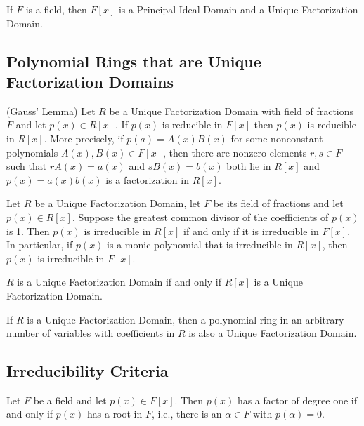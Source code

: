 \documentclass[../main]{subfiles}
\begin{document}
\begin{cor}
 If $F$ is a field, then $F[x]$ is a Principal Ideal Domain and a Unique Factorization Domain.
\end{cor}


\subsection{Polynomial Rings that are Unique Factorization Domains}


\begin{prop}
 (Gauss' Lemma) Let $R$ be a Unique Factorization Domain with field of fractions $F$ and let $p(x) \in R[x]$. If $p(x)$ is reducible in $F[x]$ then $p(x)$ is reducible in $R[x]$. More precisely, if $p(a) = A(x) B(x)$ for some nonconstant polynomials $A(x),B(x) \in F[x]$, then there are nonzero elements $r,s \in F$ such that $r A(x) = a(x)$ and $s B(x) = b(x)$ both lie in $R[x]$ and $p(x) = a(x) b(x)$ is a factorization in $R[x]$.
\end{prop}


\begin{cor}
 Let $R$ be a Unique Factorization Domain, let $F$ be its field of fractions and let $p(x) \in R[x]$. Suppose the greatest common divisor of the coefficients of $p(x)$ is 1. Then $p(x)$ is irreducible in $R[x]$ if and only if it is irreducible in $F[x]$. In particular, if $p(x)$ is a monic polynomial that is irreducible in $R[x]$, then $p(x)$ is irreducible in $F[x]$.
\end{cor}


\begin{thm}
 $R$ is a Unique Factorization Domain if and only if $R[x]$ is a Unique Factorization Domain.
\end{thm}


\begin{cor}
 If $R$ is a Unique Factorization Domain, then a polynomial ring in an arbitrary number of variables with coefficients in $R$ is also a Unique Factorization Domain.
\end{cor}


\subsection{Irreducibility Criteria}


\begin{prop}
 Let $F$ be a field and let $p(x) \in F[x]$. Then $p(x)$ has a factor of degree one if and only if $p(x)$ has a root in $F$, i.e., there is an $\alpha \in F$ with $p(\alpha) = 0$.
\end{prop}
\end{document}
